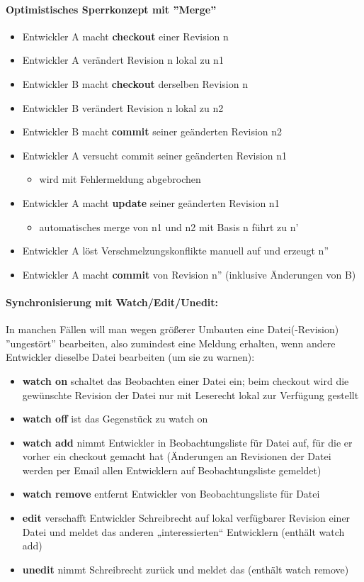 \paragraph{Optimistisches Sperrkonzept mit ''Merge''}
\begin{itemize}
\item Entwickler A macht \textbf{checkout} einer Revision n
\item Entwickler A verändert Revision n lokal zu n1
\item Entwickler B macht \textbf{checkout} derselben Revision n
\item Entwickler B verändert Revision n lokal zu n2
\item Entwickler B macht \textbf{commit} seiner geänderten Revision n2
\item Entwickler A versucht commit seiner geänderten Revision n1
\begin{itemize}
	\item wird mit Fehlermeldung abgebrochen
\end{itemize}
\item Entwickler A macht \textbf{update} seiner geänderten Revision n1 
\begin{itemize}
	\item automatisches merge von n1 und n2 mit Basis n führt zu n'
\end{itemize}
\item Entwickler A löst Verschmelzungskonflikte manuell auf und erzeugt n''
\item Entwickler A macht \textbf{commit} von Revision n'' (inklusive Änderungen von B)
\end{itemize}
\paragraph{Synchronisierung mit Watch/Edit/Unedit:}
In manchen Fällen will man wegen größerer Umbauten eine Datei(-Revision) ''ungestört'' bearbeiten, also zumindest eine Meldung erhalten, wenn andere Entwickler dieselbe Datei bearbeiten (um sie zu warnen):
\begin{itemize}
	\item \textbf{watch on} schaltet das Beobachten einer Datei ein; beim checkout wird die gewünschte Revision der Datei nur mit Leserecht lokal zur Verfügung gestellt
	\item \textbf{watch off} ist das Gegenstück zu watch on
	\item \textbf{watch add} nimmt Entwickler in Beobachtungsliste für Datei auf, für die er vorher ein checkout gemacht hat (Änderungen an Revisionen der Datei werden per Email allen Entwicklern auf Beobachtungsliste gemeldet)
	\item \textbf{watch remove} entfernt Entwickler von Beobachtungsliste für Datei
	\item \textbf{edit} verschafft Entwickler Schreibrecht auf lokal verfügbarer Revision einer Datei und meldet das anderen „interessierten“ Entwicklern (enthält watch add)
	\item \textbf{unedit} nimmt Schreibrecht zurück und meldet das (enthält watch remove)
\end{itemize}
